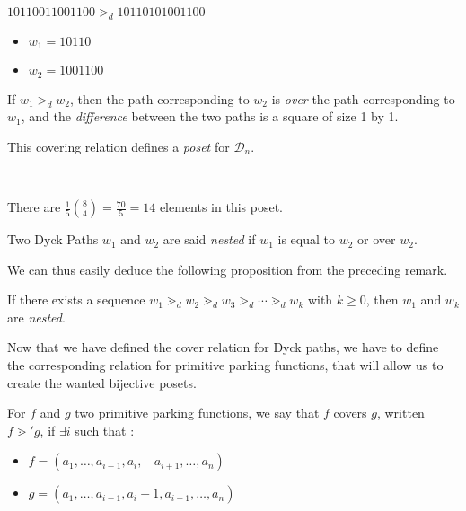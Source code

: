 \begin{example}[$n = 7$]
    $10110011001100 \gtrdot_d 10110101001100$
    \begin{itemize}
        \item $w_1 = 10110$
        \item $w_2 = 1001100$
    \end{itemize}
    
\end{example}

\begin{rem}
    If $w_1 \gtrdot_d w_2$, then the path corresponding to
    $w_2$ is \emph{over} the path corresponding to $w_1$,
    and the \emph{difference} between the two paths is a
    square of size 1 by 1.
\end{rem}

\begin{prop}
    This covering relation defines a \emph{poset}
    for $\mathcal{D}_n$.
\end{prop}

\begin{example}
    ~\\
    \begin{center}
        
        There are $\frac {1}{5} \binom{8}{4} = \frac{70}{5} = 14$
        elements in this poset.
    \end{center}
\end{example}

\begin{definition}
    Two Dyck Paths $w_1$ and $w_2$ are said \emph{nested}
    if $w_1$ is equal to $w_2$ or over $w_2$. 
\end{definition}

We can thus easily deduce the following proposition from the
preceding remark.

\begin{prop}
    If there exists a sequence $w_1 \gtrdot_d w_2 \gtrdot_d
    w_3 \gtrdot_d \cdots \gtrdot_d w_k$ with $k \geqslant 0$,
    then $w_1$ and $w_k$ are \emph{nested}.
\end{prop}

Now that we have defined the cover relation for Dyck paths,
we have to define the corresponding relation for primitive
parking functions, that will allow us to create the wanted
bijective posets.

\begin{definition}[$\gtrdot'$]
    For $f$ and $g$ two primitive parking functions, we say
    that $f$ covers $g$, written $f \gtrdot' g$, if
    $\exists i$ such that :
    \begin{itemize}
        \item $f = (a_1, \ldots, a_{i-1}, a_i,\ \ \ \ 
            a_{i+1}, \ldots, a_n)$
        \item $g = (a_1, \ldots, a_{i-1}, a_i - 1, a_{i+1},
        \ldots, a_n)$
    \end{itemize}
\end{definition}

